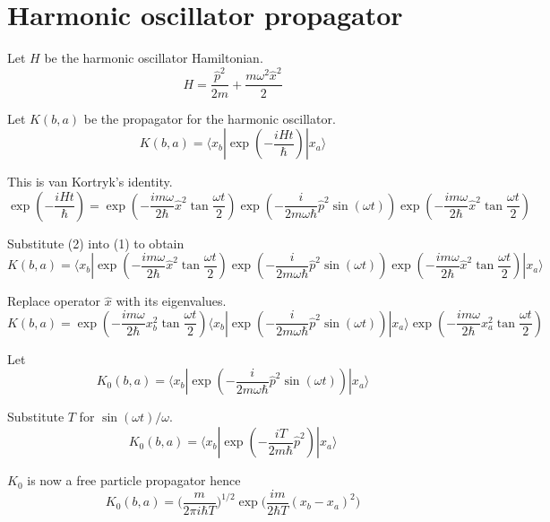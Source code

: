 

\section*{Harmonic oscillator propagator}
Let $H$ be the harmonic oscillator Hamiltonian.
\begin{equation*}
H=\frac{\hat p^2}{2m}+\frac{m\omega^2\hat x^2}{2}
\end{equation*}

Let $K(b,a)$ be the propagator for the harmonic oscillator.
\begin{equation*}
K(b,a)=\langle x_b|\exp\left(-\frac{iHt}{\hbar}\right)
|x_a\rangle
\tag{1}
\end{equation*}

This is van Kortryk's identity.
\begin{equation*}
\exp\left(-\frac{iHt}{\hbar}\right)=
\exp\left(-\frac{im\omega}{2\hbar}\hat x^2\tan\frac{\omega t}{2}\right)
\exp\left(-\frac{i}{2m\omega\hbar}\hat p^2\sin(\omega t)\right)
\exp\left(-\frac{im\omega}{2\hbar}\hat x^2\tan\frac{\omega t}{2}\right)
\tag{2}
\end{equation*}

Substitute (2) into (1) to obtain
\begin{equation*}
K(b,a)=\langle x_b|\exp\left(-\frac{im\omega}{2\hbar}\hat x^2\tan\frac{\omega t}{2}\right)
\exp\left(-\frac{i}{2m\omega\hbar}\hat p^2\sin(\omega t)\right)
\exp\left(-\frac{im\omega}{2\hbar}\hat x^2\tan\frac{\omega t}{2}\right)
|x_a\rangle
\end{equation*}

Replace operator $\hat x$ with its eigenvalues.
\begin{equation*}
K(b,a)=
\exp\left(-\frac{im\omega}{2\hbar}x_b^2\tan\frac{\omega t}{2}\right)
\langle x_b|\exp\left(-\frac{i}{2m\omega\hbar}\hat p^2\sin(\omega t)\right)|x_a\rangle
\exp\left(-\frac{im\omega}{2\hbar}x_a^2\tan\frac{\omega t}{2}\right)
\tag{3}
\end{equation*}

Let
$$
K_0(b,a)=\langle x_b|\exp\left(-\frac{i}{2m\omega\hbar}\hat p^2\sin(\omega t)\right)|x_a\rangle
$$

Substitute $T$ for $\sin(\omega t)/\omega$.
\begin{equation*}
K_0(b,a)=
\langle x_b|\exp\left(-\frac{iT}{2m\hbar}\hat p^2\right)|x_a\rangle
\end{equation*}

$K_0$ is now a free particle propagator hence
\begin{equation*}
K_0(b,a)=\biggl(\frac{m}{2\pi i\hbar T}\biggr)^{1/2}
\exp\biggl(\frac{im}{2\hbar T}(x_b-x_a)^2\biggr)
\end{equation*}

